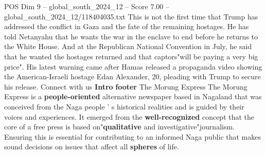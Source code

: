 \begin{textsample}{POS Dim 9 – global\_south\_2024\_12 – Score 7.00 – global\_south\_2024\_12/118404035.txt}
This is not the first time that Trump has addressed the conflict in Gaza and the fate of the remaining hostages.
He has told Netanyahu that he wants the war in the enclave to end before he returns to the White House.
And at the Republican National Convention in July, he said that he wanted the hostages returned and that captors"will be paying a very big price".
His latest warning came after Hamas released a propaganda video showing the American-Israeli hostage Edan Alexander, 20, pleading with Trump to secure his release.
Connect with us \textbf{Intro} \textbf{footer} The Morung Express The Morung Express is a \textbf{people-oriented} alternative newspaper based in Nagaland that was conceived from the Naga people ' s historical realities and is guided by their voices and experiences.
It emerged from the \textbf{well-recognized} concept that the core of a free press is based on"\textbf{qualitative} and investigative"journalism.
Ensuring this is essential for contributing to an informed Naga public that makes sound decisions on issues that affect all \textbf{spheres} of life.

\end{textsample}
